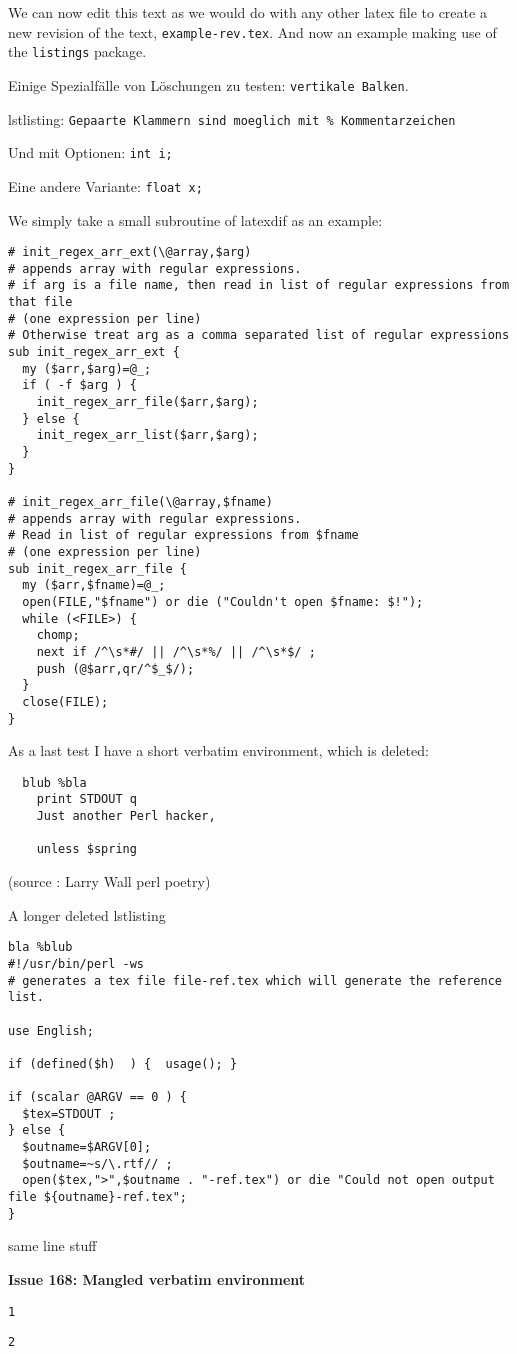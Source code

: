 \documentclass{article}
\begin{document}
We can now edit
this text as we would do with any other latex file to create
a new revision of the text, \verb|example-rev.tex|.
\newpage
And now an example making use of the \lstinline|listings| package.

Einige Spezialf\"alle von L\"oschungen zu testen: \verb|vertikale Balken|.

lstlisting: \lstinline{Gepaarte Klammern sind moeglich mit % Kommentarzeichen}

Und mit Optionen: \lstinline[basicstyle=\footnotesize]{int i;}

Eine andere Variante:   \lstinline[basicstyle=\footnotesize]$float x;$ 


We simply take a small subroutine of latexdif as an example:
\lstset{language=perl}
\begin{lstlisting}[commentstyle=\color{gray}]
# init_regex_arr_ext(\@array,$arg)
# appends array with regular expressions.
# if arg is a file name, then read in list of regular expressions from that file
# (one expression per line)
# Otherwise treat arg as a comma separated list of regular expressions
sub init_regex_arr_ext {
  my ($arr,$arg)=@_;
  if ( -f $arg ) {
    init_regex_arr_file($arr,$arg);
  } else {
    init_regex_arr_list($arr,$arg);
  }
}

# init_regex_arr_file(\@array,$fname)
# appends array with regular expressions.
# Read in list of regular expressions from $fname
# (one expression per line)
sub init_regex_arr_file {
  my ($arr,$fname)=@_;
  open(FILE,"$fname") or die ("Couldn't open $fname: $!");
  while (<FILE>) {
    chomp;
    next if /^\s*#/ || /^\s*%/ || /^\s*$/ ;
    push (@$arr,qr/^$_$/);
  }
  close(FILE);
}
\end{lstlisting}

As a last test I have a short verbatim environment, which is deleted:
\begin{verbatim}  blub %bla
    print STDOUT q
    Just another Perl hacker,
   
    unless $spring
\end{verbatim}
(source : Larry Wall perl poetry)

A longer deleted lstlisting 
\begin{lstlisting}[commentstyle=\color{gray}]  bla %blub
#!/usr/bin/perl -ws
# generates a tex file file-ref.tex which will generate the reference list.

use English; 

if (defined($h)  ) {  usage(); }

if (scalar @ARGV == 0 ) {
  $tex=STDOUT ; 
} else {
  $outname=$ARGV[0];
  $outname=~s/\.rtf// ;
  open($tex,">",$outname . "-ref.tex") or die "Could not open output file ${outname}-ref.tex";
}
\end{lstlisting}  same line stuff

\textbf{Issue 168: Mangled verbatim environment}

\begin{verbatim}
1
\end{verbatim}
\begin{verbatim}
2
\end{verbatim}
\end{document}
